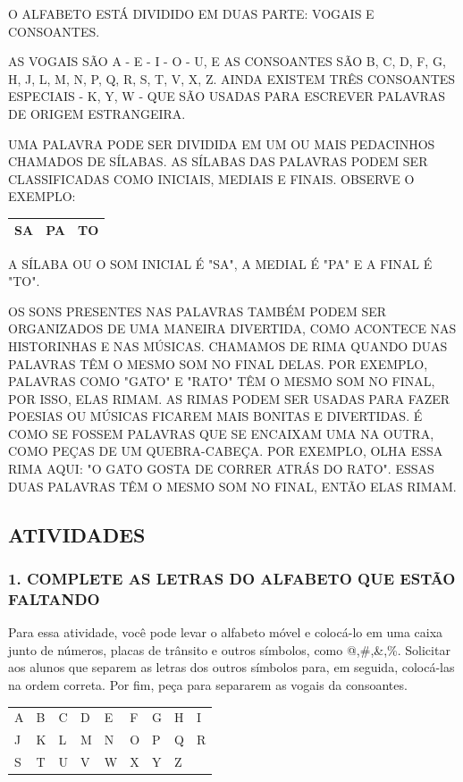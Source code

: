 O ALFABETO ESTÁ DIVIDIDO EM DUAS PARTE: VOGAIS E CONSOANTES.

AS VOGAIS SÃO A - E - I - O - U, E AS CONSOANTES SÃO B, C, D, F, G, H, J,
L, M, N, P, Q, R, S, T, V, X, Z. AINDA EXISTEM TRÊS CONSOANTES ESPECIAIS - K,
Y, W - QUE SÃO USADAS PARA ESCREVER PALAVRAS DE ORIGEM ESTRANGEIRA.

UMA PALAVRA PODE SER DIVIDIDA EM UM OU MAIS PEDACINHOS CHAMADOS DE
SÍLABAS. AS SÍLABAS DAS PALAVRAS PODEM SER CLASSIFICADAS COMO INICIAIS, MEDIAIS E FINAIS. OBSERVE O EXEMPLO:

\begin{longtable}[]{@{}lll@{}}
\toprule
\textbf{SA} & \textbf{PA} & \textbf{TO}\tabularnewline
\bottomrule
\end{longtable}

A SÍLABA OU O SOM INICIAL É "SA", A MEDIAL É "PA" E A FINAL É "TO".

OS SONS PRESENTES NAS PALAVRAS TAMBÉM PODEM SER ORGANIZADOS DE UMA MANEIRA DIVERTIDA, COMO ACONTECE NAS HISTORINHAS E NAS MÚSICAS. 
CHAMAMOS DE RIMA QUANDO DUAS PALAVRAS TÊM O MESMO SOM NO FINAL DELAS. POR EXEMPLO, PALAVRAS COMO "GATO" E "RATO" TÊM O MESMO SOM NO FINAL, POR ISSO, ELAS RIMAM.
AS RIMAS PODEM SER USADAS PARA FAZER POESIAS OU MÚSICAS FICAREM MAIS BONITAS E DIVERTIDAS. É COMO SE FOSSEM PALAVRAS QUE SE ENCAIXAM UMA NA OUTRA, COMO PEÇAS DE UM QUEBRA-CABEÇA.
POR EXEMPLO, OLHA ESSA RIMA AQUI:
"O GATO GOSTA DE CORRER ATRÁS DO RATO".
ESSAS DUAS PALAVRAS TÊM O MESMO SOM NO FINAL, ENTÃO ELAS RIMAM.

\subsection{ATIVIDADES}\label{atividades}

\subsubsection{1. COMPLETE AS LETRAS DO ALFABETO QUE ESTÃO
FALTANDO}\label{complete-as-letras-do-alfabeto-que-estuxe3o-faltando}

Para essa atividade, você pode levar o alfabeto móvel e colocá-lo em uma
caixa junto de números, placas de trânsito e outros símbolos, como
@,\#,\&,\%. Solicitar aos alunos que separem as letras dos outros símbolos para,
em seguida, colocá-las na ordem correta. Por fim, peça para separarem as vogais
da consoantes.

\begin{longtable}[]{@{}lllllllll@{}}
\toprule
A & B & C & D & E & F & G & H & I\tabularnewline
J & K & L & M & N & O & P & Q & R\tabularnewline
S & T & U & V & W & X & Y & Z\tabularnewline
\bottomrule
\end{longtable}

